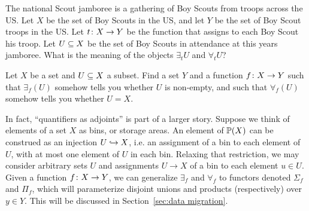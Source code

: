 \documentclass[CT4S-EN-RU]{subfiles}
\begin{document}
\begin{exampleRUS}
\end{exampleRUS}

\begin{exerciseENG}
The national Scout jamboree is a gathering of Boy Scouts from troops across the US. Let $X$ be the set of Boy Scouts in the US, and let $Y$ be the set of Boy Scout troops in the US. Let $t\taking X\to Y$ be the function that assigns to each Boy Scout his troop. Let $U\ss X$ be the set of Boy Scouts in attendance at this years jamboree. What is the meaning of the objects $\exists_tU$ and $\forall_tU$?
\end{exerciseENG}

\begin{exerciseRUS}
\end{exerciseRUS}

\begin{exerciseENG}
Let $X$ be a set and $U\ss X$ a subset. Find a set $Y$ and a function $f\taking X\to Y$ such that $\exists_f(U)$ somehow tells you whether $U$ is non-empty, and such that $\forall_f(U)$ somehow tells you whether $U=X$.
\end{exerciseENG}

\begin{exerciseRUS}
\end{exerciseRUS}

\begin{blockENG}
In fact, “quantifiers as adjoints” is part of a larger story. Suppose we think of elements of a set $X$ as bins, or storage areas. An element of $\PP(X)$ can be construed as an injection $U\inj X$, i.e. an assignment of a bin to each element of $U$, with at most one element of $U$ in each bin. Relaxing that restriction, we may consider arbitrary sets $U$ and assignments $U\to X$ of a bin to each element $u\in U$. Given a function $f\taking X\to Y$, we can generalize $\exists_f$ and $\forall_f$ to functors denoted $\Sigma_f$ and $\Pi_f$, which will parameterize disjoint unions and products (respectively) over $y\in Y$. This will be discussed in Section~\ref{sec:data migration}.
\end{blockENG}

\begin{blockRUS}
\end{blockRUS}


\subsection{}\label{sec:universal concepts}
\end{document}
